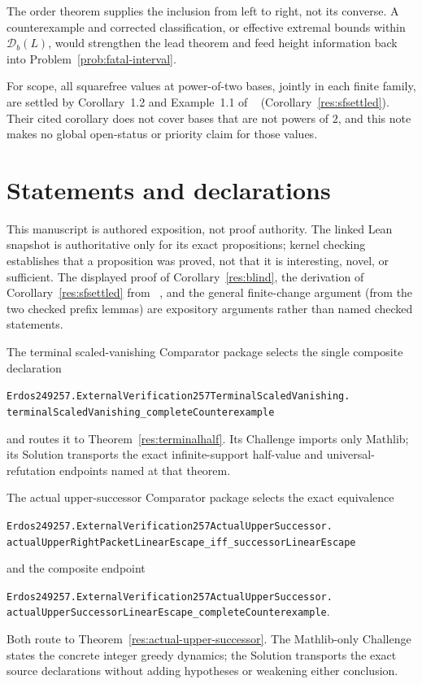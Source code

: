 \documentclass[11pt]{article}
\begin{document}
\noindent The order theorem supplies the inclusion from left to right, not
its converse.  A counterexample and corrected classification, or effective
extremal bounds within $\mathcal D_b(L)$, would strengthen the lead theorem
and feed height information back into Problem~\ref{prob:fatal-interval}.

\noindent For scope, all squarefree values at power-of-two bases, jointly in
each finite family, are settled by Corollary~1.2 and Example~1.1 of
~\cite[author-preprint p.~4]{duverneytachiya}
(Corollary~\ref{res:sfsettled}).  Their cited
corollary does not cover bases that are not powers of \(2\), and this note
makes no global open-status or priority claim for those values.

\section*{Statements and declarations}

This manuscript is authored exposition, not proof authority.  The linked Lean
snapshot is authoritative only for its exact propositions; kernel checking
establishes that a proposition was proved, not that it is interesting, novel,
or sufficient.  The displayed proof of Corollary~\ref{res:blind}, the
derivation of Corollary~\ref{res:sfsettled} from
~\cite[Cor.~1.2 and Ex.~1.1, author-preprint p.~4]{duverneytachiya},
and the general finite-change argument (from the two checked prefix lemmas) are
expository arguments rather than named checked statements.

The terminal scaled-vanishing Comparator package selects the single composite
declaration
\begin{center}
\small
\texttt{Erdos249257.ExternalVerification257TerminalScaledVanishing.}\allowbreak
\texttt{terminalScaledVanishing\_completeCounterexample}
\end{center}
and routes it to Theorem~\ref{res:terminalhalf}.  Its Challenge imports only
Mathlib; its Solution transports the exact infinite-support half-value and
universal-refutation endpoints named at that theorem.

The actual upper-successor Comparator package selects the exact equivalence
\begin{center}
\small
\texttt{Erdos249257.ExternalVerification257ActualUpperSuccessor.}\allowbreak
\texttt{actualUpperRightPacketLinearEscape\_iff\_successorLinearEscape}
\end{center}
and the composite endpoint
\begin{center}
\small
\texttt{Erdos249257.ExternalVerification257ActualUpperSuccessor.}\allowbreak
\texttt{actualUpperSuccessorLinearEscape\_completeCounterexample}.
\end{center}
Both route to Theorem~\ref{res:actual-upper-successor}.  The Mathlib-only
Challenge states the concrete integer greedy dynamics; the Solution transports
the exact source declarations without adding hypotheses or weakening either
conclusion.
\end{document}
